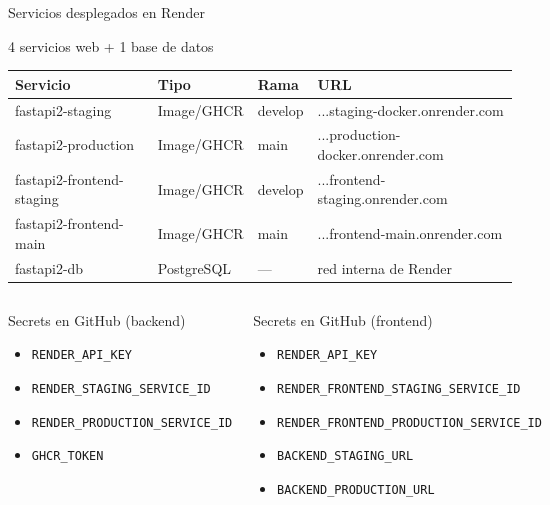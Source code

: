 \documentclass[aspectratio=169]{beamer}
\begin{document}
\begin{frame}{Servicios desplegados en Render}
  \begin{block}{4 servicios web + 1 base de datos}
    \begin{center}
      \begin{tabular}{llll}
        \toprule
        \textbf{Servicio} & \textbf{Tipo} & \textbf{Rama} & \textbf{URL} \\
        \midrule
        fastapi2-staging & Image/GHCR & develop & ...staging-docker.onrender.com \\
        fastapi2-production & Image/GHCR & main & ...production-docker.onrender.com \\
        fastapi2-frontend-staging & Image/GHCR & develop & ...frontend-staging.onrender.com \\
        fastapi2-frontend-main & Image/GHCR & main & ...frontend-main.onrender.com \\
        fastapi2-db & PostgreSQL & --- & red interna de Render \\
        \bottomrule
      \end{tabular}
    \end{center}
  \end{block}

  \vspace{0.3cm}

  \begin{columns}
    \begin{block}{Secrets en GitHub (backend)}
      \begin{itemize}
        \item \texttt{RENDER\_API\_KEY}
        \item \texttt{RENDER\_STAGING\_SERVICE\_ID}
        \item \texttt{RENDER\_PRODUCTION\_SERVICE\_ID}
        \item \texttt{GHCR\_TOKEN}
      \end{itemize}
    \end{block}

    \begin{block}{Secrets en GitHub (frontend)}
      \begin{itemize}
        \item \texttt{RENDER\_API\_KEY}
        \item \texttt{RENDER\_FRONTEND\_STAGING\_SERVICE\_ID}
        \item \texttt{RENDER\_FRONTEND\_PRODUCTION\_SERVICE\_ID}
        \item \texttt{BACKEND\_STAGING\_URL}
        \item \texttt{BACKEND\_PRODUCTION\_URL}
      \end{itemize}
    \end{block}
  \end{columns}
\end{frame}
\end{document}
